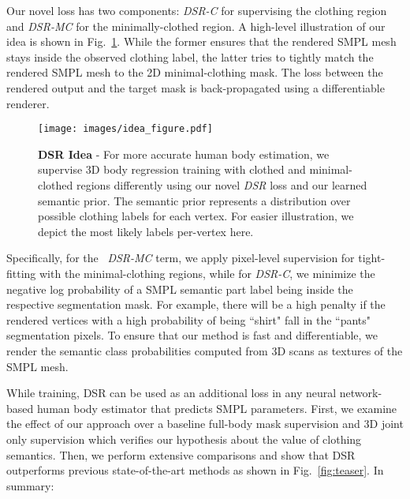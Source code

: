 \documentclass[10pt,twocolumn,letterpaper]{article}
\newcommand{\modelname}[0]{DSR\xspace}
\begin{document}
Our novel loss has two components: \textit{\modelname-C} for supervising the clothing region and \textit{\modelname-MC} for the minimally-clothed region. A high-level illustration of our idea is shown in Fig.~\ref{fig:idea}. While the former ensures that the rendered SMPL mesh stays inside the observed clothing label, the latter tries to tightly match the rendered SMPL mesh to the 2D minimal-clothing mask. The loss between the rendered output and the target mask is back-propagated using a differentiable renderer.
\begin{figure}[t]
    \texttt{[image: images/idea\_figure.pdf]}
    \caption{\textbf{DSR Idea} - For more accurate human body estimation, we supervise 3D body regression training with clothed and minimal-clothed regions differently using our novel \emph{DSR} loss and our learned semantic prior. The semantic prior represents a distribution over possible clothing labels for each vertex. For easier illustration, we depict the most likely labels per-vertex here.}
    \label{fig:idea}
\end{figure}
Specifically, for the ~\textit{\modelname-MC} term, we apply pixel-level supervision for tight-fitting with the minimal-clothing regions, while for \textit{\modelname-C}, we minimize the negative log probability of a SMPL semantic part label being inside the respective segmentation mask. For example, there will be a high penalty if the rendered vertices with a high probability of being ``shirt" fall in the ``pants" segmentation pixels. To ensure that our method is fast and differentiable, we render the semantic class probabilities computed from 3D scans as textures of the SMPL mesh. 

While training, DSR can be used as an additional loss in any neural network-based human body estimator that predicts SMPL parameters. 
First, we examine the effect of our approach over a baseline full-body mask supervision and 3D joint only supervision which verifies our hypothesis about the value of clothing semantics.
Then, we perform extensive comparisons and show that \modelname outperforms previous state-of-the-art methods as shown in Fig.~\ref{fig:teaser}. In summary:
\end{document}
